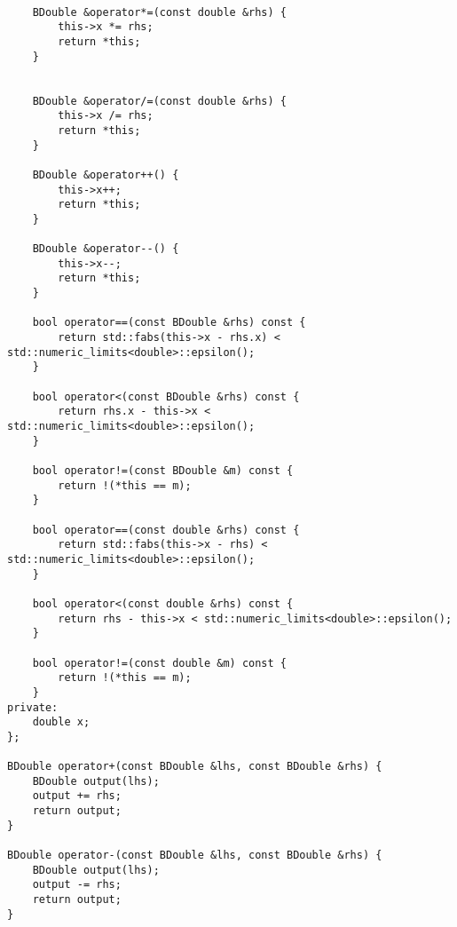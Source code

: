 \begin{codesnippet}
\begin{verbatim}    
    
    BDouble &operator*=(const double &rhs) {
        this->x *= rhs;
        return *this;
    }
    
    
    BDouble &operator/=(const double &rhs) {
        this->x /= rhs;
        return *this;
    }

    BDouble &operator++() {
        this->x++;
        return *this;
    }

    BDouble &operator--() {
        this->x--;
        return *this;
    }

    bool operator==(const BDouble &rhs) const {
        return std::fabs(this->x - rhs.x) < std::numeric_limits<double>::epsilon();
    }

    bool operator<(const BDouble &rhs) const {
        return rhs.x - this->x < std::numeric_limits<double>::epsilon();
    }

    bool operator!=(const BDouble &m) const {
        return !(*this == m);
    }

    bool operator==(const double &rhs) const {
        return std::fabs(this->x - rhs) < std::numeric_limits<double>::epsilon();
    }

    bool operator<(const double &rhs) const {
        return rhs - this->x < std::numeric_limits<double>::epsilon();
    }

    bool operator!=(const double &m) const {
        return !(*this == m);
    }
private:
    double x;
};

BDouble operator+(const BDouble &lhs, const BDouble &rhs) {
    BDouble output(lhs);
    output += rhs;
    return output;
}

BDouble operator-(const BDouble &lhs, const BDouble &rhs) {
    BDouble output(lhs);
    output -= rhs;
    return output;
}

\end{verbatim}
\end{codesnippet}

